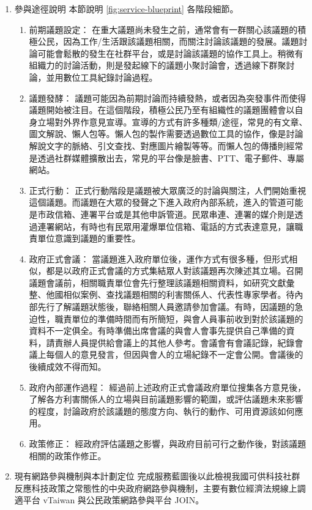 \documentclass[12pt,a4paper]{article}
\begin{document}
\begin{enumerate}
\item 參與途徑說明
\label{sec:orgd68b5b5}
本節說明 \ref{fig:service-blueprint} 各階段細節。
\begin{enumerate}
\item 前期議題設定：
\label{sec:org5bd89e2}
在重大議題尚未發生之前，通常會有一群關心該議題的積極公民，因為工作/生活跟該議題相關，而關注討論該議題的發展。議題討論可能會鬆散的發生在社群平台，或是討論該議題的協作工具上。稍微有組織力的討論活動，則是發起線下的議題小聚討論會，透過線下群聚討論，並用數位工具紀錄討論過程。
\item 議題發酵：
\label{sec:orgae1cede}
議題可能因為前期討論而持續發熱，或者因為突發事件而使得議題開始被注目。在這個階段，積極公民乃至有組織性的議題團體會以自身立場對外界作意見宣導。宣導的方式有許多種類/途徑，常見的有文章、圖文解說、懶人包等。懶人包的製作需要透過數位工具的協作，像是討論解說文字的脈絡、引文查找、對應圖片繪製等等。而懶人包的傳播則經常是透過社群媒體擴散出去，常見的平台像是臉書、PTT、電子郵件、專屬網站。
\item 正式行動：
\label{sec:orgb816dfb}
正式行動階段是議題被大眾廣泛的討論與關注，人們開始重視這個議題。而議題在大眾的發聲之下進入政府內部系統，進入的管道可能是市政信箱、連署平台或是其他申訴管道。民眾串連、連署的媒介則是透過連署網站，有時也有民眾用灌爆單位信箱、電話的方式表達意見，讓職責單位意識到議題的重要性。
\item 政府正式會議：
\label{sec:org19c6ad4}
當議題進入政府單位後，運作方式有很多種，但形式相似，都是以政府正式會議的方式集結眾人對該議題再次陳述其立場。召開議題會議前，相關職責單位會先行整理該議題相關資料，如研究文獻彙整、他國相似案例、查找議題相關的利害關係人、代表性專家學者。待內部先行了解議題狀態後，聯絡相關人員邀請參加會議。有時，因議題的急迫性，職責單位的準備時間而有所簡短，與會人員事前收到對於該議題的資料不一定俱全。有時準備出席會議的與會人會事先提供自己準備的資料，請責辦人員提供給會議上的其他人參考。會議會有會議記錄，紀錄會議上每個人的意見發言，但因與會人的立場紀錄不一定會公開。會議後的後續成效不得而知。
\item 政府內部運作過程：
\label{sec:orgcd40576}
經過前上述政府正式會議政府單位搜集各方意見後，了解各方利害關係人的立場與目前議題影響的範圍，或評估議題未來影響的程度，討論政府於該議題的態度方向、執行的動作、可用資源該如何應用。
\item 政策修正：
\label{sec:org39d9b01}
經政府評估議題之影響，與政府目前可行之動作後，對該議題相關的政策作修正。
\end{enumerate}

\item 現有網路參與機制與本計劃定位
\label{sec:org1384e64}
完成服務藍圖後以此檢視我國可供科技社群反應科技政策之常態性的中央政府網路參與機制，主要有數位經濟法規線上調適平台 vTaiwan 與公民政策網路參與平台 JOIN。


\end{enumerate}
\end{document}
